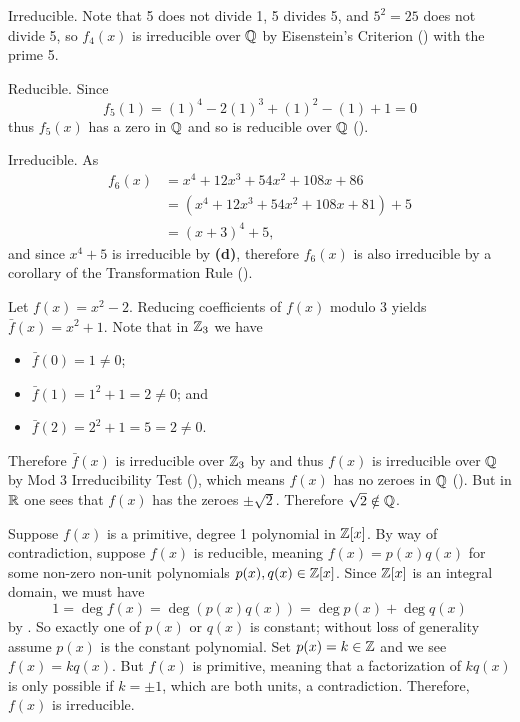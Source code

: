 \begin{questions}
\begin{partquestions}{\alph*}
        \item Irreducible. Note that 5 does not divide 1, 5 divides 5, and $5^2 = 25$ does not divide 5, so $f_4(x)$ is irreducible over $\mathbb{Q}$ by Eisenstein's Criterion () with the prime 5.

        \item Reducible. Since
        \[
            f_5(1) = (1)^4 - 2(1)^3 + (1)^2 - (1) + 1 = 0
        \]
        thus $f_5(x)$ has a zero in $\mathbb{Q}$ and so is reducible over $\mathbb{Q}$ ().

        \item Irreducible. As
        \begin{align*}
            f_6(x) &= x^4 + 12x^3 + 54x^2 + 108x + 86\\
            &= (x^4 + 12x^3 + 54x^2 + 108x + 81) + 5\\
            &= (x+3)^4 + 5,
        \end{align*}
        and since $x^4 + 5$ is irreducible by \textbf{(d)}, therefore $f_6(x)$ is also irreducible by a corollary of the Transformation Rule ().
    \end{partquestions}

    \item Let $f(x) = x^2 - 2$. Reducing coefficients of $f(x)$ modulo 3 yields $\bar{f}(x) = x^2 + 1$. Note that in $\mathbb{Z}_3$ we have
    \begin{itemize}
        \item $\bar{f}(0) = 1 \neq 0$;
        \item $\bar{f}(1) = 1^2 + 1 = 2 \neq 0$; and
        \item $\bar{f}(2) = 2^2 + 1 = 5 = 2 \neq 0$.
    \end{itemize}
    Therefore $\bar{f}(x)$ is irreducible over $\mathbb{Z}_3$ by  and thus $f(x)$ is irreducible over $\mathbb{Q}$ by Mod 3 Irreducibility Test (), which means $f(x)$ has no zeroes in $\mathbb{Q}$ (). But in $\mathbb{R}$ one sees that $f(x)$ has the zeroes $\pm\sqrt2$. Therefore $\sqrt2 \notin \mathbb{Q}$.

    \item Suppose $f(x)$ is a primitive, degree 1 polynomial in $\mathbb{Z}[x]$. By way of contradiction, suppose $f(x)$ is reducible, meaning $f(x) = p(x)q(x)$ for some non-zero non-unit polynomials $p(x), q(x) \in \mathbb{Z}[x]$. Since $\mathbb{Z}[x]$ is an integral domain, we must have
    \[
        1 = \deg f(x) = \deg(p(x)q(x)) = \deg p(x) + \deg q(x)
    \]
    by . So exactly one of $p(x)$ or $q(x)$ is constant; without loss of generality assume $p(x)$ is the constant polynomial. Set $p(x) = k \in \mathbb{Z}$ and we see $f(x) = kq(x)$. But $f(x)$ is primitive, meaning that a factorization of $kq(x)$ is only possible if $k = \pm1$, which are both units, a contradiction. Therefore, $f(x)$ is irreducible.


\end{questions}
